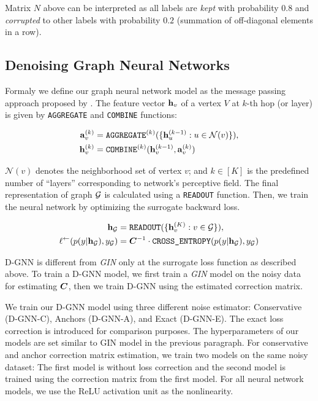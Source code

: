 \documentclass{article} %
\begin{document}
Matrix $N$ above can be interpreted as all labels are \emph{kept} with 
probability $0.8$ and \emph{corrupted} to other labels with probability $0.2$ 
(summation of off-diagonal elements in a row).

\subsection{Denoising Graph Neural Networks}

Formaly we define our graph neural network model as the message passing approach 
proposed by \cite{xu2018how}. The feature vector ${\mathbf{h}}_v$ of a vertex $V$ 
at $k$-th hop (or layer) is given by \texttt{AGGREGATE} and \texttt{COMBINE} functions:

\begin{equation}
  \begin{split}
{\mathbf{a}}^{(k)}_{v} & = \texttt{AGGREGATE}^{(k)} (\{{\mathbf{h}}^{(k-1)}_u: u \in \mathcal{N}(v)\}), \\
{\mathbf{h}}^{(k)}_v & = \texttt{COMBINE}^{(k)} ({\mathbf{h}}_v^{(k-1)}, {\mathbf{a}}_v^{(k)})
  \end{split}
\end{equation}

$\mathcal{N}(v)$ denotes the neighborhood set of vertex $v$; and $k \in [K]$ is the predefined number of 
``layers'' corresponding to network's perceptive field. The final representation 
of graph ${\mathcal{G}}$ is calculated using a \texttt{READOUT} function. Then, we train the neural network by optimizing
the surrogate backward loss.

\begin{equation}
  \begin{split}
{\mathbf{h}}_{{\mathcal{G}}} & = \texttt{READOUT} (\{{\mathbf{h}}^{(K)}_v: v \in {\mathcal{G}}\}), \\
\ell^{\leftarrow}(p(y|{\mathbf{h}}_{\mathcal{G}}), y_{\mathcal{G}}) & = {\bm{C}}^{-1} \cdot  \texttt{CROSS\_ENTROPY} (p(y|{\mathbf{h}}_{\mathcal{G}}), y_{\mathcal{G}})
  \end{split}
\end{equation}

D-GNN is different from \emph{GIN} only at the surrogate loss function as 
described above. To train a D-GNN model, we first train a \emph{GIN} model 
on the noisy data for estimating ${\bm{C}}$, then we train D-GNN using the estimated 
correction matrix.

We train our D-GNN model using three different noise 
estimator: Conservative (D-GNN-C), Anchors (D-GNN-A), and Exact (D-GNN-E). The 
exact loss correction is introduced for comparison purposes.
The hyperparameters of our models are set similar to GIN model in the previous
paragraph. For conservative and anchor correction matrix estimation, we train 
two models on the same noisy dataset: The first model is without loss correction
and the second model is trained using the correction matrix from the first model.
For all neural network models, we use the ReLU activation unit as the nonlinearity.
\end{document}

